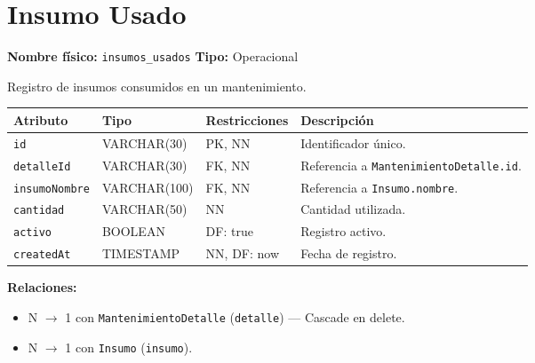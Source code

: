 \documentclass[12pt,a4paper]{article}
\newenvironment{tabladesc}[3]{%
  \section{#1}
  \textbf{Nombre físico:} \texttt{#2} \hfill \textbf{Tipo:} #3\par
  \medskip
}{%
  \bigskip
}
\begin{document}
\begin{tabladesc}{Insumo Usado}{insumos\_usados}{Operacional}

Registro de insumos consumidos en un mantenimiento.

\bigskip
\begin{longtable}{L{3.5cm} L{2.5cm} L{2cm} L{7.5cm}}
\toprule
\textbf{Atributo} & \textbf{Tipo} & \textbf{Restricciones} & \textbf{Descripción} \\
\midrule
\endhead
\bottomrule
\endfoot
\texttt{id}          & VARCHAR(30)  & PK, NN & Identificador único. \\
\texttt{detalleId}   & VARCHAR(30)  & FK, NN & Referencia a \texttt{MantenimientoDetalle.id}. \\
\texttt{insumoNombre}& VARCHAR(100) & FK, NN & Referencia a \texttt{Insumo.nombre}. \\
\texttt{cantidad}    & VARCHAR(50)  & NN     & Cantidad utilizada. \\
\texttt{activo}      & BOOLEAN      & DF: true & Registro activo. \\
\texttt{createdAt}   & TIMESTAMP    & NN, DF: now & Fecha de registro. \\
\bottomrule
\end{longtable}

\textbf{Relaciones:}
\begin{itemize}[nosep]
  \item N $\rightarrow$ 1 con \texttt{MantenimientoDetalle} (\texttt{detalle}) — Cascade en delete.
  \item N $\rightarrow$ 1 con \texttt{Insumo} (\texttt{insumo}).
\end{itemize}
\end{tabladesc}
\end{document}
